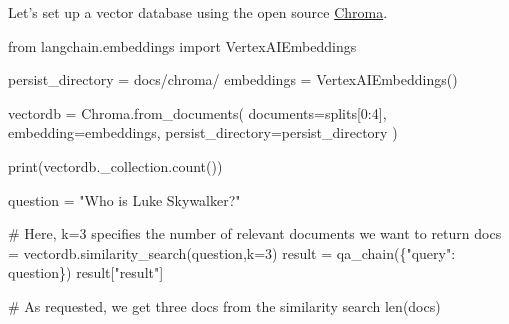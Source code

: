 \documentclass[
  letterpaper,
  DIV=11,
  numbers=noendperiod]{scrreprt}
\newenvironment{Shaded}{\begin{snugshade}}{\end{snugshade}}
\newcommand{\BuiltInTok}[1]{\textcolor[rgb]{0.00,0.23,0.31}{#1}}
\newcommand{\CommentTok}[1]{\textcolor[rgb]{0.37,0.37,0.37}{#1}}
\newcommand{\DecValTok}[1]{\textcolor[rgb]{0.68,0.00,0.00}{#1}}
\newcommand{\ImportTok}[1]{\textcolor[rgb]{0.00,0.46,0.62}{#1}}
\newcommand{\NormalTok}[1]{\textcolor[rgb]{0.00,0.23,0.31}{#1}}
\newcommand{\OperatorTok}[1]{\textcolor[rgb]{0.37,0.37,0.37}{#1}}
\newcommand{\StringTok}[1]{\textcolor[rgb]{0.13,0.47,0.30}{#1}}
\begin{document}
Let's set up a vector database using the open source
\href{https://www.trychroma.com/}{Chroma}.

\begin{Shaded}
\begin{Highlighting}[]
\ImportTok{from}\NormalTok{ langchain.embeddings }\ImportTok{import}\NormalTok{ VertexAIEmbeddings}

\NormalTok{persist\_directory }\OperatorTok{=} \StringTok{\textquotesingle{}docs/chroma/\textquotesingle{}}
\NormalTok{embeddings }\OperatorTok{=}\NormalTok{ VertexAIEmbeddings()}

\NormalTok{vectordb }\OperatorTok{=}\NormalTok{ Chroma.from\_documents(}
\NormalTok{    documents}\OperatorTok{=}\NormalTok{splits[}\DecValTok{0}\NormalTok{:}\DecValTok{4}\NormalTok{],}
\NormalTok{    embedding}\OperatorTok{=}\NormalTok{embeddings,}
\NormalTok{    persist\_directory}\OperatorTok{=}\NormalTok{persist\_directory}
\NormalTok{)}
\end{Highlighting}
\end{Shaded}

\begin{Shaded}
\begin{Highlighting}[]
\BuiltInTok{print}\NormalTok{(vectordb.\_collection.count())}
\end{Highlighting}
\end{Shaded}

\begin{Shaded}
\begin{Highlighting}[]
\NormalTok{question }\OperatorTok{=} \StringTok{"Who is Luke Skywalker?"}
\end{Highlighting}
\end{Shaded}

\begin{Shaded}
\begin{Highlighting}[]
\CommentTok{\# Here, k=3 specifies the number of relevant documents we want to return}
\NormalTok{docs }\OperatorTok{=}\NormalTok{ vectordb.similarity\_search(question,k}\OperatorTok{=}\DecValTok{3}\NormalTok{)}
\NormalTok{result }\OperatorTok{=}\NormalTok{ qa\_chain(\{}\StringTok{"query"}\NormalTok{: question\})}
\NormalTok{result[}\StringTok{"result"}\NormalTok{]}
\end{Highlighting}
\end{Shaded}

\begin{Shaded}
\begin{Highlighting}[]
\CommentTok{\# As requested, we get three docs from the similarity search}
\BuiltInTok{len}\NormalTok{(docs)}
\end{Highlighting}
\end{Shaded}
\end{document}
